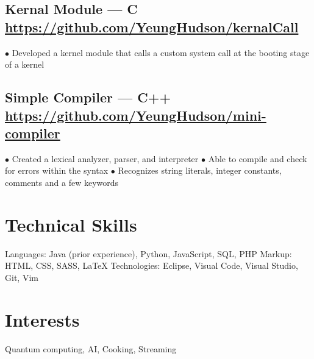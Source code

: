\documentclass{article}
\newcommand\bulletpts{$\bullet$}
\newcommand\bulletspace{\hspace*{.5em}}
\begin{document}
\subsection{Kernal Module --- C \hfill{}\newline\small\url{https://github.com/YeungHudson/kernalCall}}
\bulletspace\bulletpts{} Developed a kernel module that calls a custom system call at the booting stage of a kernel
\subsection{Simple Compiler --- C++ \hfill{}\newline\small\url{https://github.com/YeungHudson/mini-compiler}}
\bulletspace\bulletpts{} Created a lexical analyzer, parser, and interpreter \newline 
\bulletspace\bulletpts{} Able to compile and check for errors within the syntax \newline
\bulletspace\bulletpts{} Recognizes string literals, integer constants, comments and a few keywords

\section{Technical Skills}
Languages: Java (prior experience), Python, JavaScript, SQL, PHP \newline
Markup: HTML, CSS, SASS, {\LaTeX} \newline
Technologies: Eclipse, Visual Code, Visual Studio, Git, Vim

\section{Interests}
Quantum computing, AI, Cooking, Streaming
\end{document}
